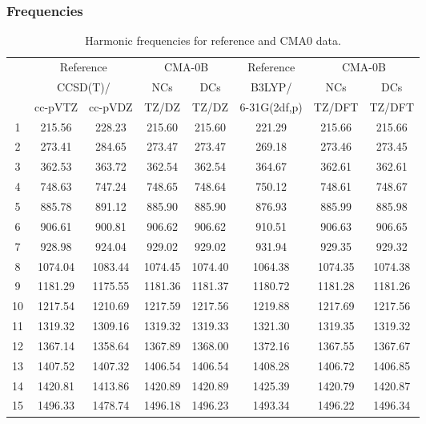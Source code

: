 \documentclass[10pt,oneside]{article}
\begin{document}
\clearpage

\subsubsection*{Frequencies}
\begin{table}[h!]
\centering
\caption{Harmonic frequencies for reference and CMA0 data.}
\begin{tabular}{cccccccc}
\toprule
{} & \multicolumn{2}{c}{Reference} & \multicolumn{2}{c}{CMA-0B} &    Reference & \multicolumn{2}{c}{CMA-0B} \\
{} & \multicolumn{2}{c}{CCSD(T)/} &     NCs &     DCs &       B3LYP/ &     NCs &     DCs \\
{} &   cc-pVTZ & cc-pVDZ &   TZ/DZ &   TZ/DZ & 6-31G(2df,p) &  TZ/DFT &  TZ/DFT \\
\midrule
1  &    215.56 &  228.23 &  215.60 &  215.60 &       221.29 &  215.66 &  215.66 \\
2  &    273.41 &  284.65 &  273.47 &  273.47 &       269.18 &  273.46 &  273.45 \\
3  &    362.53 &  363.72 &  362.54 &  362.54 &       364.67 &  362.61 &  362.61 \\
4  &    748.63 &  747.24 &  748.65 &  748.64 &       750.12 &  748.61 &  748.67 \\
5  &    885.78 &  891.12 &  885.90 &  885.90 &       876.93 &  885.99 &  885.98 \\
6  &    906.61 &  900.81 &  906.62 &  906.62 &       910.51 &  906.63 &  906.65 \\
7  &    928.98 &  924.04 &  929.02 &  929.02 &       931.94 &  929.35 &  929.32 \\
8  &   1074.04 & 1083.44 & 1074.45 & 1074.40 &      1064.38 & 1074.35 & 1074.38 \\
9  &   1181.29 & 1175.55 & 1181.36 & 1181.37 &      1180.72 & 1181.28 & 1181.26 \\
10 &   1217.54 & 1210.69 & 1217.59 & 1217.56 &      1219.88 & 1217.69 & 1217.56 \\
11 &   1319.32 & 1309.16 & 1319.32 & 1319.33 &      1321.30 & 1319.35 & 1319.32 \\
12 &   1367.14 & 1358.64 & 1367.89 & 1368.00 &      1372.16 & 1367.55 & 1367.67 \\
13 &   1407.52 & 1407.32 & 1406.54 & 1406.54 &      1408.28 & 1406.72 & 1406.85 \\
14 &   1420.81 & 1413.86 & 1420.89 & 1420.89 &      1425.39 & 1420.79 & 1420.87 \\
15 &   1496.33 & 1478.74 & 1496.18 & 1496.23 &      1493.34 & 1496.22 & 1496.34 \\

\end{tabular}
\end{table}
\end{document}
